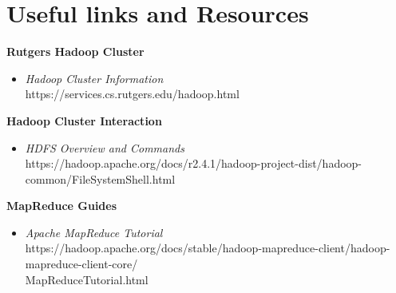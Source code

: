 \documentclass{article}
\begin{document}
\section*{Useful links and Resources}
\textbf{Rutgers Hadoop Cluster}
\begin{itemize}
    \item \textit{Hadoop Cluster Information}\\ https://services.cs.rutgers.edu/hadoop.html
\end{itemize}
\textbf{Hadoop Cluster Interaction}
\begin{itemize}
    \item \textit{HDFS Overview and Commands}\\ https://hadoop.apache.org/docs/r2.4.1/hadoop-project-dist/hadoop-common/FileSystemShell.html
\end{itemize}
\textbf{MapReduce Guides}
\begin{itemize}
    \item \textit{Apache MapReduce Tutorial}\\ https://hadoop.apache.org/docs/stable/hadoop-mapreduce-client/hadoop-mapreduce-client-core/\\MapReduceTutorial.html
\end{itemize} 

\-\\\\\\\\\\\\\noindent \date{Last Updated: \today}


%
\end{document}
